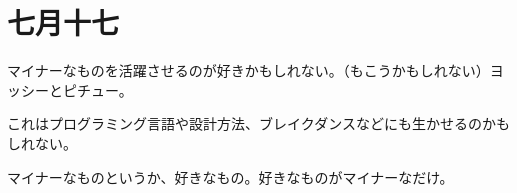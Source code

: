\chapter{七月十七}
マイナーなものを活躍させるのが好きかもしれない。（もこうかもしれない）ヨッシーとピチュー。

これはプログラミング言語や設計方法、ブレイクダンスなどにも生かせるのかもしれない。

マイナーなものというか、好きなもの。好きなものがマイナーなだけ。

